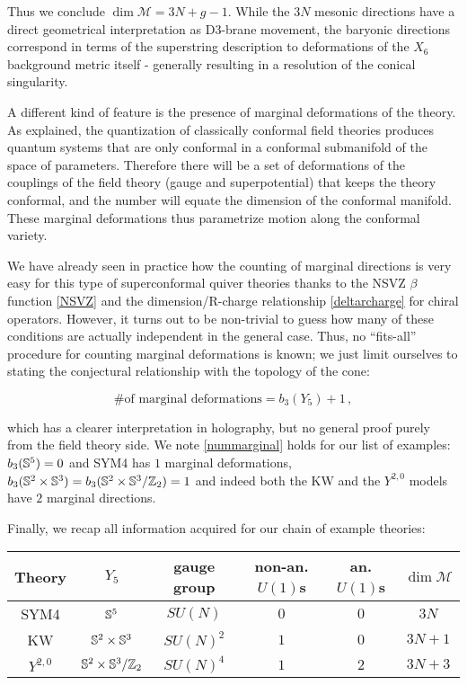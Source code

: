 Thus we conclude $\dim \mathcal M = 3N + g - 1$. While the $3N$ mesonic directions have a direct geometrical interpretation as D3-brane movement, the baryonic directions correspond in terms of the superstring description to deformations of the $X_6$ background metric itself - generally resulting in a resolution of the conical singularity.%

A different kind of feature is the presence of marginal deformations of the theory. As explained, the quantization of classically conformal field theories produces quantum systems that are only conformal in a conformal submanifold of the space of parameters. Therefore there will be a set of deformations of the couplings of the field theory (gauge and superpotential) that keeps the theory conformal, and the number will equate the dimension of the conformal manifold. These marginal deformations thus parametrize motion along the conformal variety. 

We have already seen in practice how the counting of marginal directions is very easy for this type of superconformal quiver theories thanks to the NSVZ $\beta$ function \eqref{NSVZ} and the dimension/R-charge relationship \eqref{deltarcharge} for chiral operators. However, it turns out to be non-trivial to guess how many of these conditions are actually independent in the general case. Thus, no ``fits-all'' procedure for counting marginal deformations is known; we just limit ourselves to stating the conjectural relationship with the topology of the cone:

\begin{equation}
	\text{\# of marginal deformations} = b_3(Y_5) + 1\,,
	\label{nummarginal}
\end{equation}

which has a clearer interpretation in holography, but no general proof purely from the field theory side. We note \eqref{nummarginal} holds for our list of examples: $b_3(\mathbb{S}^5) = 0$ and SYM4 has $1$ marginal deformations, $b_3(\mathbb{S}^2 \times \mathbb{S}^3) = {b_3(\mathbb{S}^2 \times \mathbb{S}^3 / \mathbb{Z}_2)} = 1$ and indeed both the KW and the $Y^{2,0}$ models have $2$ marginal directions.

Finally, we recap all information acquired for our chain of example theories:

\begin{center}
	\begin{tabular}[]{cccccc}
Theory & $Y_5$	& gauge group &non-an. $U(1)$s & an. $U(1)$s & $\dim \mathcal{M}$ \\	\midrule \midrule
SYM4	& 	$\mathbb{S}^5$   & $SU(N)$	& $0$	 & $0$  & $3N$ \\
KW	& 	$\mathbb{S}^2\times\mathbb{S}^3$   & $SU(N)^2$	& $1$	 & $0$  & $3N+1$ \\
$Y^{2,0}$	& 	$\mathbb{S}^2\times\mathbb{S}^3/\mathbb{Z}_2$   & $SU(N)^4$	& $1$	 & $2$  & $3N+3$ \\
	\end{tabular}
\end{center}

